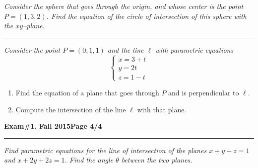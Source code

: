 \documentclass[12pt]{article}
\begin{document}
\bigskip
{\problem[15 pts] \em Consider the sphere that goes through the origin, and whose center is the point $P=(1,3,2)$.  Find the equation of the circle of intersection of this sphere with the $xy$--plane.} 
\vspace{5cm}
\begin{flushright}
\end{flushright}
\hrule
{\problem[10 pts] \em Consider the point $P=(0,1,1)$ and the line $\ell$ with parametric equations}
\begin{equation*}
\begin{cases}
x = 3+t \\ y = 2t \\ z = 1-t
\end{cases}
\end{equation*}
\begin{enumerate}
\item Find the equation of a plane that goes through $P$ and is perpendicular to $\ell$.
\vspace{2cm}
\begin{flushright}
\end{flushright}
\item  Compute the intersection of the line $\ell$ with that plane.
\vspace{3cm}
\begin{flushright}
\end{flushright}
\end{enumerate}
\newpage

\hfill{\large\bf Exam\#1.}\hfill{\large\bf
  Fall 2015}\hfill{\large\bf Page 4/4}\hrule

\bigskip
{\problem[20 pts] \em Find parametric equations for the line of intersection
of the planes $x+y+z=1$ and $x+2y+2z=1$.  Find the angle $\theta$ between the
two planes.}
\vspace{18.5cm}
\begin{flushright}
\end{flushright}
\end{document}
